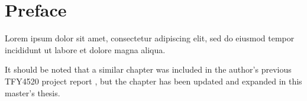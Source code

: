 \chapter*{Preface}

Lorem ipsum dolor sit amet, consectetur adipiscing elit, sed do eiusmod tempor incididunt ut labore et dolore magna aliqua.


It should be noted that a similar chapter was included in the author's previous TFY4520 project report \cite{project_report}, but the chapter has been updated and expanded in this master's thesis.